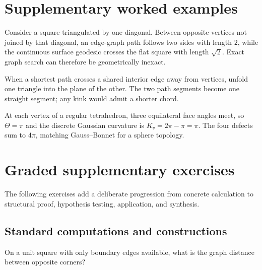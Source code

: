 \section{Supplementary worked examples}
\label{sec:vii38-pedagogy}

\begin{example}\label{ex:vii38-ped-01}
Consider a square triangulated by one diagonal.  Between opposite vertices not joined by that diagonal, an edge-graph path follows two sides with length \(2\), while the continuous surface geodesic crosses the flat square with length \(\sqrt2\).  Exact graph search can therefore be geometrically inexact.
\end{example}

\begin{example}\label{ex:vii38-ped-02}
When a shortest path crosses a shared interior edge away from vertices, unfold one triangle into the plane of the other.  The two path segments become one straight segment; any kink would admit a shorter chord.
\end{example}

\begin{example}\label{ex:vii38-ped-03}
At each vertex of a regular tetrahedron, three equilateral face angles meet, so \(\Theta=\pi\) and the discrete Gaussian curvature is \(K_v=2\pi-\pi=\pi\).  The four defects sum to \(4\pi\), matching Gauss--Bonnet for a sphere topology.
\end{example}

\section{Graded supplementary exercises}
The following exercises add a deliberate progression from concrete calculation to structural proof, hypothesis testing, application, and synthesis.

\subsection*{Standard computations and constructions}

\begin{exercise}\label{exr:vii38-ped-01}
On a unit square with only boundary edges available, what is the graph distance between opposite corners?
\end{exercise}

